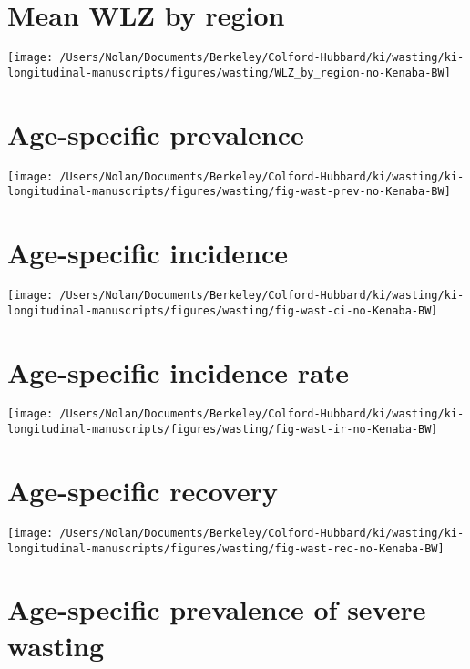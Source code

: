 \documentclass[9pt,]{book}
\begin{document}
\section{Mean WLZ by region}\label{mean-wlz-by-region}

\texttt{[image: /Users/Nolan/Documents/Berkeley/Colford-Hubbard/ki/wasting/ki-longitudinal-manuscripts/figures/wasting/WLZ\_by\_region-no-Kenaba-BW]}

\section{Age-specific prevalence}\label{age-specific-prevalence-2}

\texttt{[image: /Users/Nolan/Documents/Berkeley/Colford-Hubbard/ki/wasting/ki-longitudinal-manuscripts/figures/wasting/fig-wast-prev-no-Kenaba-BW]}

\section{Age-specific incidence}\label{age-specific-incidence-1}

\texttt{[image: /Users/Nolan/Documents/Berkeley/Colford-Hubbard/ki/wasting/ki-longitudinal-manuscripts/figures/wasting/fig-wast-ci-no-Kenaba-BW]}

\section{Age-specific incidence
rate}\label{age-specific-incidence-rate-1}

\texttt{[image: /Users/Nolan/Documents/Berkeley/Colford-Hubbard/ki/wasting/ki-longitudinal-manuscripts/figures/wasting/fig-wast-ir-no-Kenaba-BW]}

\section{Age-specific recovery}\label{age-specific-recovery-1}

\texttt{[image: /Users/Nolan/Documents/Berkeley/Colford-Hubbard/ki/wasting/ki-longitudinal-manuscripts/figures/wasting/fig-wast-rec-no-Kenaba-BW]}

\section{Age-specific prevalence of severe
wasting}\label{age-specific-prevalence-of-severe-wasting-2}
\end{document}

